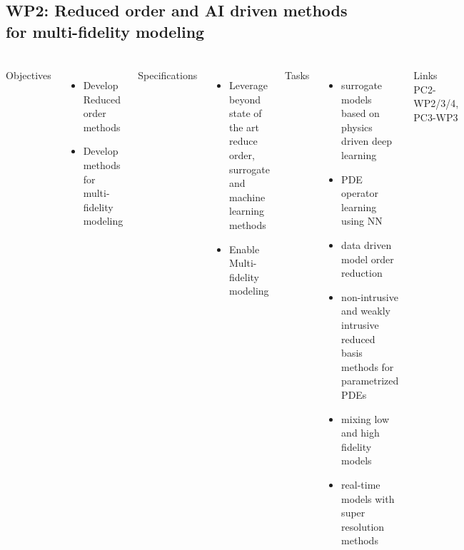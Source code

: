 \subsection{WP2: Reduced order and AI driven methods for multi-fidelity modeling} 
\begin{frame}
  \frametitle{\insertsectionhead}
  \framesubtitle{\insertsubsectionhead}
\footnotesize
  \begin{columns}[t]
    Objectives
    \begin{itemize}
      \item Develop Reduced order methods 
      \item Develop methods for multi-fidelity modeling 
    \end{itemize}

      Specifications
      \begin{itemize}
        \item Leverage beyond state of the art reduce order, surrogate and machine learning methods
        \item Enable Multi-fidelity modeling
      \end{itemize}
    Tasks
    \begin{itemize}
      \item surrogate models based on physics driven deep learning
      \item PDE operator learning using NN
      \item data driven model order reduction
      \item non-intrusive and weakly intrusive reduced basis methods for parametrized PDEs
      \item mixing low and high fidelity models
      \item real-time models with super resolution methods
    \end{itemize}
    \begin{alertblock}{Links}
      PC2-WP2/3/4, PC3-WP3
    \end{alertblock}

  \end{columns}
\end{frame}

